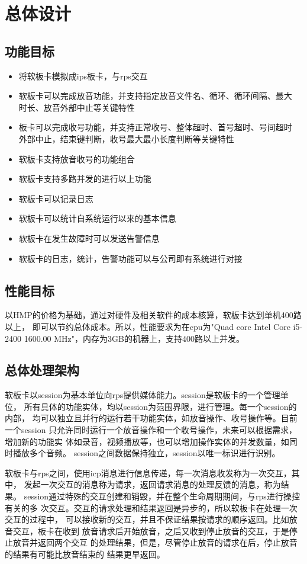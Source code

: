 \documentclass[11pt]{article}
\begin{document}
\section{总体设计}
\subsection{功能目标}
    \begin{itemize}
        \item 将软板卡模拟成ips板卡，与rps交互
        \item 软板卡可以完成放音功能，并支持指定放音文件名、循环、循环间隔、最大
            时长、放音外部中止等关键特性
        \item 板卡可以完成收号功能，并支持正常收号、整体超时、首号超时、号间超时
            外部中止，结束键判断，收号最大最小长度判断等关键特性
        \item 软板卡支持放音收号的功能组合
        \item 软板卡支持多路并发的进行以上功能
        \item 软板卡可以记录日志
        \item 软板卡可以统计自系统运行以来的基本信息
        \item 软板卡在发生故障时可以发送告警信息
        \item 软板卡的日志，统计，告警功能可以与公司即有系统进行对接
    \end{itemize}
\subsection{性能目标}
    以HMP的价格为基础，通过对硬件及相关软件的成本核算，软板卡达到单机400路以上，
    即可以节约总体成本。所以，性能要求为在cpu为"Quad core Intel Core i5-2400
    1600.00 MHz"，内存为3GB的机器上，支持400路以上并发。

\subsection{总体处理架构}
    软板卡以session为基本单位向rps提供媒体能力。session是软板卡的一个管理单位，
    所有具体的功能实体，均以session为范围界限，进行管理。每一个session的内部，
    均可以独立且并行的运行若干功能实体，如放音操作、收号操作等。目前一个session
    只允许同时运行一个放音操作和一个收号操作，未来可以根据需求，增加新的功能实
    体如录音，视频播放等，也可以增加操作实体的并发数量，如同时播放多个音频。
    session之间数据保持独立，session以唯一标识进行识别。

    软板卡与rps之间，使用icp消息进行信息传递，每一次消息收发称为一次交互，其中，
    发起一次交互的消息称为请求，返回请求消息的处理反馈的消息，称为结果。
    session通过特殊的交互创建和销毁，并在整个生命周期期间，与rps进行操控有关的多
    次交互。交互的请求处理和结果返回是异步的，所以软板卡在处理一次交互的过程中，
    可以接收新的交互，并且不保证结果按请求的顺序返回。比如放音交互，板卡在收到
    放音请求后开始放音，之后又收到停止放音的交互，于是停止放音并返回两个交互
    的处理结果，但是，尽管停止放音的请求在后，停止放音的结果有可能比放音结束的
    结果更早返回。
\end{document}
